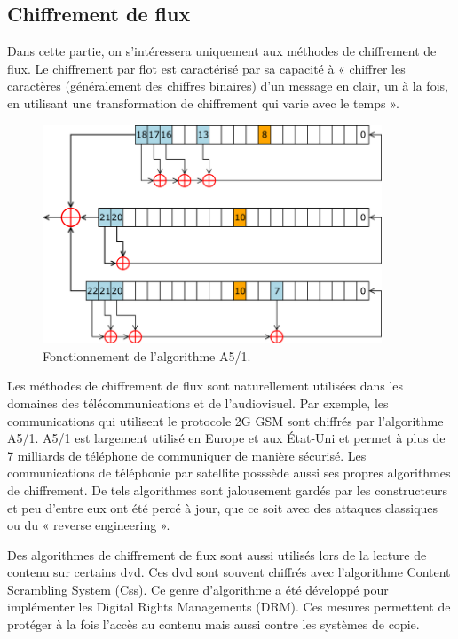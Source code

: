 \subsection{Chiffrement de flux}

Dans cette partie, on s'intéressera uniquement aux méthodes de chiffrement
de flux. Le chiffrement par flot est caractérisé par sa capacité à « chiffrer
les caractères (généralement des chiffres binaires) d'un message en clair, un à
la fois, en utilisant une transformation de chiffrement qui varie avec le
temps »\cite{appliedCrypto}.

\begin{figure}[!h]
	\centering
	\includegraphics[width=0.9\textwidth]{imgs/application/A5.png}
	\caption{Fonctionnement de l'algorithme A5/1.}
	\label{algoA5}
\end{figure}

Les méthodes de chiffrement de flux sont naturellement utilisées dans les
domaines des télécommunications et de l'audiovisuel. Par exemple, les
communications qui utilisent le protocole 2G GSM sont chiffrés par
l'algorithme A5/1. A5/1 est largement utilisé en Europe et aux État-Uni et
permet à plus de 7 milliards de téléphone de communiquer de manière
sécurisé\cite{7milliards}. Les communications de téléphonie par satellite
posssède aussi ses propres algorithmes de chiffrement. De tels algorithmes
sont jalousement gardés par les constructeurs et peu d'entre eux ont été percé à
jour, que ce soit avec des attaques classiques ou du « reverse engineering ».

Des algorithmes de chiffrement de flux sont aussi utilisés lors de la lecture
de contenu sur certains dvd. Ces dvd sont souvent chiffrés avec l'algorithme
Content Scrambling System (Css). Ce genre d'algorithme a été développé pour
implémenter les Digital Rights Managements (DRM). Ces mesures permettent de
protéger à la fois l'accès au contenu mais aussi contre les systèmes de copie.
